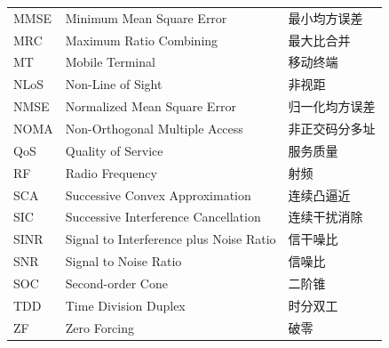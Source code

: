 \begin{abbreabstract}
\begin{supertabular}{p{2cm}p{9cm}p{8cm}}
         MMSE  &  Minimum Mean Square Error  &  最小均方误差 \\
         MRC  &  Maximum Ratio Combining  &  最大比合并 \\
         MT  &  Mobile Terminal  &  移动终端 \\
         NLoS  &  Non-Line of Sight  &  非视距 \\
         NMSE  &  Normalized Mean Square Error  &  归一化均方误差 \\
         NOMA  &  Non-Orthogonal Multiple Access  &  非正交码分多址 \\
         QoS  &  Quality of Service  &  服务质量 \\
         RF  &  Radio Frequency  &  射频 \\
         SCA  &  Successive Convex Approximation  &  连续凸逼近 \\
         SIC  &  Successive Interference Cancellation  &  连续干扰消除 \\
         SINR  &  Signal to Interference plus Noise Ratio  &  信干噪比 \\
         SNR  &  Signal to Noise Ratio  &  信噪比 \\
         SOC  &  Second-order Cone  &  二阶锥 \\
         TDD  &  Time Division Duplex  &  时分双工 \\
         ZF  &  Zero Forcing  &  破零 \\
\end{supertabular}
\end{abbreabstract}

